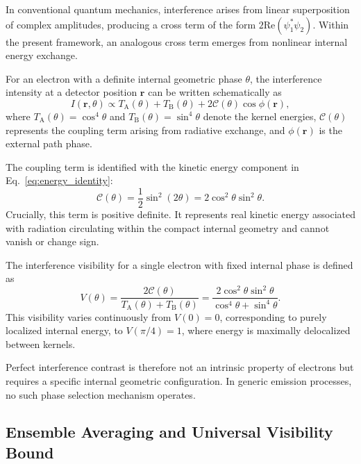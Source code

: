 \documentclass[%
 reprint,
 amsmath,amssymb,
 aps,
 prb,
]{revtex4-2}
\numberwithin{equation}{section}
\begin{document}
In conventional quantum mechanics, interference arises from linear superposition of complex amplitudes, producing a cross term of the form $2\mathrm{Re}(\psi_1^*\psi_2)$. Within the present framework, an analogous cross term emerges from nonlinear internal energy exchange.

For an electron with a definite internal geometric phase $\theta$, the interference intensity at a detector position $\mathbf{r}$ can be written schematically as
\begin{equation}
I(\mathbf{r},\theta) \propto T_{\mathrm{A}}(\theta) + T_{\mathrm{B}}(\theta) + 2\mathcal{C}(\theta)\cos\phi(\mathbf{r}),
\label{eq:intensity_pattern}
\end{equation}
where $T_{\mathrm{A}}(\theta) = \cos^4\theta$ and $T_{\mathrm{B}}(\theta) = \sin^4\theta$ denote the kernel energies, $\mathcal{C}(\theta)$ represents the coupling term arising from radiative exchange, and $\phi(\mathbf{r})$ is the external path phase.

The coupling term is identified with the kinetic energy component in Eq.~\eqref{eq:energy_identity}:
\begin{equation}
\mathcal{C}(\theta) = \frac{1}{2}\sin^2(2\theta) = 2\cos^2\theta\sin^2\theta.
\label{eq:coupling_term}
\end{equation}
Crucially, this term is positive definite. It represents real kinetic energy associated with radiation circulating within the compact internal geometry and cannot vanish or change sign.

The interference visibility for a single electron with fixed internal phase is defined as
\begin{equation}
V(\theta) = \frac{2\mathcal{C}(\theta)}{T_{\mathrm{A}}(\theta) + T_{\mathrm{B}}(\theta)}
= \frac{2\cos^2\theta\sin^2\theta}{\cos^4\theta + \sin^4\theta}.
\label{eq:visibility_function}
\end{equation}
This visibility varies continuously from $V(0) = 0$, corresponding to purely localized internal energy, to $V(\pi/4) = 1$, where energy is maximally delocalized between kernels.

Perfect interference contrast is therefore not an intrinsic property of electrons but requires a specific internal geometric configuration. In generic emission processes, no such phase selection mechanism operates.


\subsection{Ensemble Averaging and Universal Visibility Bound}
\label{subsec:ensemble_average}
\end{document}
